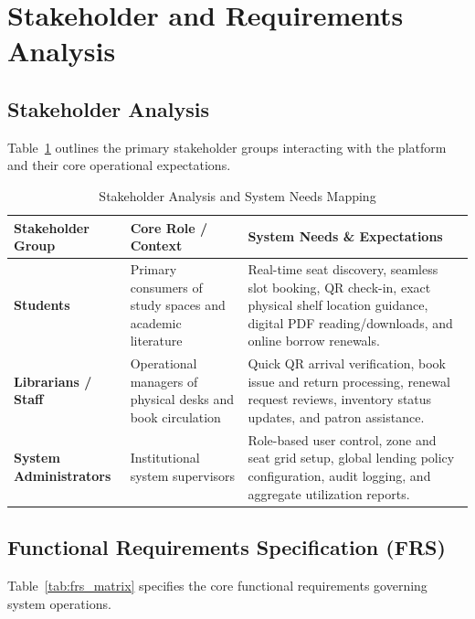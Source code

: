 \section{Stakeholder and Requirements Analysis}

\subsection{Stakeholder Analysis}
Table~\ref{tab:stakeholder_mapping} outlines the primary stakeholder groups interacting with the platform and their core operational expectations.

\begin{table}[H]
\centering
\caption{Stakeholder Analysis and System Needs Mapping}
\label{tab:stakeholder_mapping}
\small
\begin{tabularx}{\textwidth}{>{\raggedright\arraybackslash}p{2.8cm} >{\raggedright\arraybackslash}p{4.2cm} >{\raggedright\arraybackslash}X}
\toprule
\textbf{Stakeholder Group} & \textbf{Core Role / Context} & \textbf{System Needs \& Expectations} \\
\midrule
\textbf{Students} & Primary consumers of study spaces and academic literature & Real-time seat discovery, seamless slot booking, QR check-in, exact physical shelf location guidance, digital PDF reading/downloads, and online borrow renewals. \\
\textbf{Librarians / Staff} & Operational managers of physical desks and book circulation & Quick QR arrival verification, book issue and return processing, renewal request reviews, inventory status updates, and patron assistance. \\
\textbf{System Administrators} & Institutional system supervisors & Role-based user control, zone and seat grid setup, global lending policy configuration, audit logging, and aggregate utilization reports. \\
\bottomrule
\end{tabularx}
\end{table}

\subsection{Functional Requirements Specification (FRS)}
Table~\ref{tab:frs_matrix} specifies the core functional requirements governing system operations.

